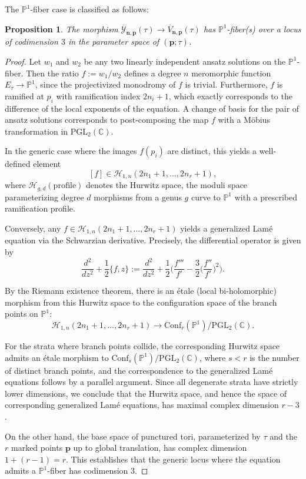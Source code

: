 \documentclass[11pt]{amsart}
\newtheorem{proposition}[theorem]{Proposition}
\theoremstyle{remark}
\numberwithin{equation}{section}
\begin{document}
The $\mathbb{P}^1$-fiber case is classified as follows:

\begin{proposition} \label{prop:P1_codim_3}
The morphism $\overline{\mathcal{Y}}_{\mathbf{n},\mathbf{p}}(\tau) \rightarrow \overline{V}_{\mathbf{n},\mathbf{p}}(\tau)$ has $\mathbb{P}^1$-fiber(s) over a locus of codimension $3$ in the parameter space of $(\mathbf{p}; \tau)$.
\end{proposition}

\begin{proof}
Let $w_1$ and $w_2$ be any two linearly independent ansatz solutions on the $\mathbb{P}^1$-fiber. Then the ratio $f := w_1/w_2$ defines a degree $n$ meromorphic function $E_\tau \rightarrow \mathbb{P}^1$, since the projectivized monodromy of $f$ is trivial. Furthermore, $f$ is ramified at $p_i$ with ramification index $2n_i+1$, which exactly corresponds to the difference of the local exponents of the equation. A change of basis for the pair of ansatz solutions corresponds to post-composing the map $f$ with a M\"obius transformation in $\mathrm{PGL}_2(\mathbb{C})$. 

In the generic case where the images $f(p_i)$ are distinct, this yields a well-defined element
\[
    [f] \in \mathcal{H}_{1,n}(2n_1+1,\dots,2n_r+1),
\]
where $\mathcal{H}_{g,d}(\text{profile})$ denotes the Hurwitz space, the moduli space parameterizing degree $d$ morphisms from a genus $g$ curve to $\mathbb{P}^1$ with a prescribed ramification profile. 

Conversely, any $f \in \mathcal{H}_{1,n}(2n_1+1,\dots,2n_r+1)$ yields a generalized Lam\'e equation via the Schwarzian derivative. Precisely, the differential operator is given by
\[
    \frac{d^2}{dz^2} + \frac{1}{2}\{ f,z \} := \frac{d^2}{dz^2} + \frac{1}{2} \Bigg( \frac{f'''}{f'} - \frac{3}{2}\bigg( \frac{f''}{f'} \bigg)^2 \Bigg). 
\]

By the Riemann existence theorem, there is an \'etale (local bi-holomorphic) morphism from this Hurwitz space to the configuration space of the branch points on $\mathbb{P}^1$:
\[
    \mathcal{H}_{1,n}(2n_1+1,\dots,2n_r+1) \rightarrow \mathrm{Conf}_r(\mathbb{P}^1) / \mathrm{PGL}_2(\mathbb{C}).
\]

For the strata where branch points collide, the corresponding Hurwitz space admits an \'etale morphism to $\mathrm{Conf}_s(\mathbb{P}^1) / \mathrm{PGL}_2(\mathbb{C})$, where $s < r$ is the number of distinct branch points, and the correspondence to the generalized Lam\'e equations follows by a parallel argument. Since all degenerate strata have strictly lower dimensions, we conclude that the Hurwitz space, and hence the space of corresponding generalized Lam\'e equations, has maximal complex dimension $r-3$.

On the other hand, the base space of punctured tori, parameterized by $\tau$ and the $r$ marked points $\mathbf{p}$ up to global translation, has complex dimension $1 + (r-1) = r$. This establishes that the generic locus where the equation admits a $\mathbb{P}^1$-fiber has codimension $3$.
\end{proof}
\end{document}

